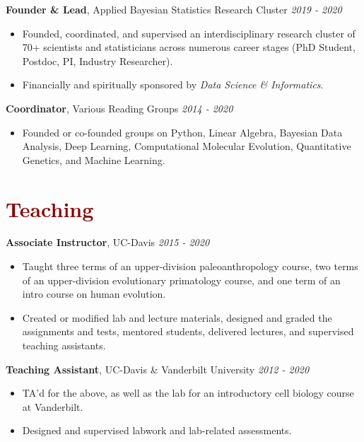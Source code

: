 \documentclass[11pt,margin,line]{resume}
\begin{document}
\begin{resume}
\textbf{Founder \& Lead}, Applied Bayesian Statistics Research Cluster \hfill \emph{2019 - 2020}
\begin{itemize}[noitemsep]
\item Founded, coordinated, and supervised an interdisciplinary research cluster of 70+ scientists and statisticians across numerous career stages (PhD Student, Postdoc, PI, Industry Researcher). \item Financially and spiritually sponsored by \emph{Data Science \& Informatics}.
\end{itemize} 
\vspace{-1.5mm}

\textbf{Coordinator}, Various Reading Groups \hfill \emph{2014 - 2020}
\begin{itemize}[noitemsep]
\item Founded or co-founded groups on Python, Linear Algebra, Bayesian Data Analysis, Deep Learning, Computational Molecular Evolution, Quantitative Genetics, and Machine Learning.
\end{itemize} 
\vspace{-1.5mm}

\section{\large\textcolor{DarkRed}{Teaching}}

\textbf{Associate Instructor}, UC-Davis \hfill \emph{2015  - 2020}
\begin{itemize}[noitemsep]
\item Taught three terms of an upper-division paleoanthropology course, two terms of an upper-division evolutionary primatology course, and one term of an intro course on human evolution. 
\item Created or modified lab and lecture materials, designed and graded the assignments and tests, mentored students, delivered lectures, and supervised teaching assistants.
\end{itemize} 
\vspace{-1.5mm}

\textbf{Teaching Assistant}, UC-Davis \& Vanderbilt University \hfill \emph{2012  - 2020}
\begin{itemize}[noitemsep]
\item TA'd for the above, as well as the lab for an introductory cell biology course at Vanderbilt. 
\item Designed and supervised labwork and lab-related assessments.
\end{itemize}
\vspace{-1.5mm}


\end{resume}
\end{document}
